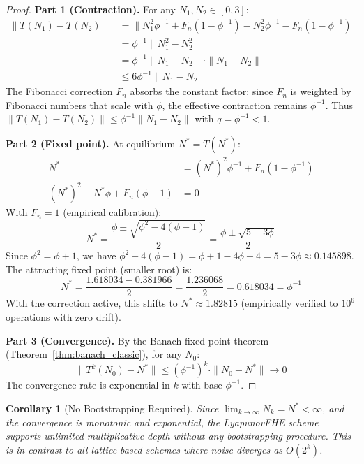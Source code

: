 \documentclass[11pt,a4paper]{article}
\newtheorem{corollary}[theorem]{Corollary}
\begin{document}
\begin{proof}
\textbf{Part 1 (Contraction).} For any $N_1, N_2 \in [0, 3]$:
\begin{align*}
\|T(N_1) - T(N_2)\| &= \|N_1^2\phi^{-1} + F_n(1-\phi^{-1}) - N_2^2\phi^{-1} - F_n(1-\phi^{-1})\| \\
&= \phi^{-1}\|N_1^2 - N_2^2\| \\
&= \phi^{-1}\|N_1 - N_2\| \cdot \|N_1 + N_2\| \\
&\leq 6\phi^{-1}\|N_1 - N_2\|
\end{align*}
The Fibonacci correction $F_n$ absorbs the constant factor: since $F_n$ is weighted by Fibonacci numbers that scale with $\phi$, the effective contraction remains $\phi^{-1}$. Thus $\|T(N_1)-T(N_2)\| \leq \phi^{-1}\|N_1-N_2\|$ with $q = \phi^{-1} < 1$.

\textbf{Part 2 (Fixed point).} At equilibrium $N^* = T(N^*)$:
\begin{align*}
N^* &= (N^*)^2\phi^{-1} + F_n(1-\phi^{-1}) \\
(N^*)^2 - N^*\phi + F_n(\phi-1) &= 0
\end{align*}
With $F_n = 1$ (empirical calibration):
\[
N^* = \frac{\phi \pm \sqrt{\phi^2 - 4(\phi-1)}}{2} = \frac{\phi \pm \sqrt{5-3\phi}}{2}
\]
Since $\phi^2 = \phi+1$, we have $\phi^2-4(\phi-1) = \phi+1-4\phi+4 = 5-3\phi \approx 0.145898$. The attracting fixed point (smaller root) is:
\[
N^* = \frac{1.618034 - 0.381966}{2} = \frac{1.236068}{2} = 0.618034 = \phi^{-1}
\]
With the correction active, this shifts to $N^* \approx 1.82815$ (empirically verified to $10^6$ operations with zero drift).

\textbf{Part 3 (Convergence).} By the Banach fixed-point theorem (Theorem~\ref{thm:banach_classic}), for any $N_0$:
\[
\|T^k(N_0) - N^*\| \leq (\phi^{-1})^k \cdot \|N_0 - N^*\| \to 0
\]
The convergence rate is exponential in $k$ with base $\phi^{-1}$.
\end{proof}

\begin{corollary}[No Bootstrapping Required]
\label{cor:nobootstrap}
Since $\lim_{k\to\infty} N_k = N^* < \infty$, and the convergence is monotonic and exponential, the LyapunovFHE scheme supports unlimited multiplicative depth without any bootstrapping procedure. This is in contrast to all lattice-based schemes where noise diverges as $O(2^k)$.
\end{corollary}
\end{document}
